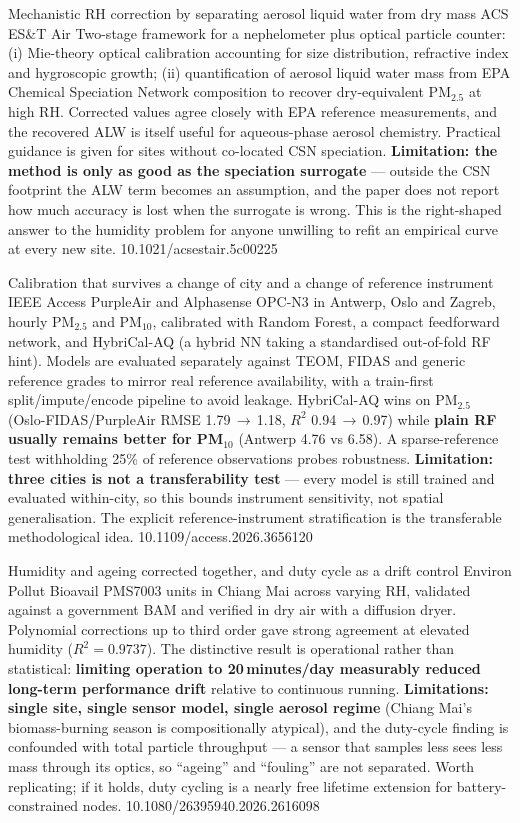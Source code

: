 \documentclass[10pt]{article}
\begin{document}
{Mechanistic RH correction by separating aerosol liquid water from dry mass}
{ACS ES\&T Air}
{Two-stage framework for a nephelometer plus optical particle counter: (i) Mie-theory
optical calibration accounting for size distribution, refractive index and hygroscopic
growth; (ii) quantification of aerosol liquid water mass from EPA Chemical Speciation
Network composition to recover dry-equivalent PM$_{2.5}$ at high RH. Corrected values
agree closely with EPA reference measurements, and the recovered ALW is itself useful for
aqueous-phase aerosol chemistry. Practical guidance is given for sites without co-located
CSN speciation. \textbf{Limitation: the method is only as good as the speciation
surrogate} --- outside the CSN footprint the ALW term becomes an assumption, and the paper
does not report how much accuracy is lost when the surrogate is wrong. This is the
right-shaped answer to the humidity problem for anyone unwilling to refit an empirical
curve at every new site.}
{10.1021/acsestair.5c00225}

{Calibration that survives a change of city and a change of reference instrument}
{IEEE Access}
{PurpleAir and Alphasense OPC-N3 in Antwerp, Oslo and Zagreb, hourly PM$_{2.5}$ and
PM$_{10}$, calibrated with Random Forest, a compact feedforward network, and HybriCal-AQ
(a hybrid NN taking a standardised out-of-fold RF hint). Models are evaluated separately
against TEOM, FIDAS and generic reference grades to mirror real reference availability,
with a train-first split/impute/encode pipeline to avoid leakage. HybriCal-AQ wins on
PM$_{2.5}$ (Oslo-FIDAS/PurpleAir RMSE 1.79\,$\to$\,1.18, $R^2$ 0.94\,$\to$\,0.97) while
\textbf{plain RF usually remains better for PM$_{10}$} (Antwerp 4.76 vs 6.58). A
sparse-reference test withholding 25\% of reference observations probes robustness.
\textbf{Limitation: three cities is not a transferability test} --- every model is still
trained and evaluated within-city, so this bounds instrument sensitivity, not spatial
generalisation. The explicit reference-instrument stratification is the transferable
methodological idea.}
{10.1109/access.2026.3656120}

{Humidity and ageing corrected together, and duty cycle as a drift control}
{Environ Pollut Bioavail}
{PMS7003 units in Chiang Mai across varying RH, validated against a government BAM and
verified in dry air with a diffusion dryer. Polynomial corrections up to third order gave
strong agreement at elevated humidity (\textbf{$R^2 = 0.9737$}). The distinctive result is
operational rather than statistical: \textbf{limiting operation to 20\,minutes/day
measurably reduced long-term performance drift} relative to continuous running.
\textbf{Limitations: single site, single sensor model, single aerosol regime}
(Chiang Mai's biomass-burning season is compositionally atypical), and the duty-cycle
finding is confounded with total particle throughput --- a sensor that samples less sees
less mass through its optics, so ``ageing'' and ``fouling'' are not separated. Worth
replicating; if it holds, duty cycling is a nearly free lifetime extension for
battery-constrained nodes.}
{10.1080/26395940.2026.2616098}
\end{document}
